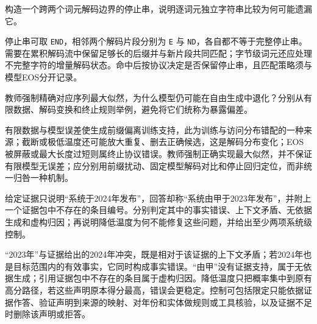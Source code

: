 \begin{exercises}
\begin{exercise} 构造一个跨两个词元解码边界的停止串，说明逐词元独立字符串比较为何可能遗漏它。

\begin{solution}
停止串可取 \texttt{END}，相邻两个解码片段分别为 \texttt{E} 与 \texttt{ND}，各自都不等于完整停止串。需要在累积解码流中保留足够长的后缀并与新片段共同匹配；字节级词元还应处理不完整字符的增量解码状态。命中后按协议决定是否保留停止串，且匹配策略须与模型EOS分开记录。
\end{solution}
\end{exercise}

\begin{exercise} 教师强制精确对应序列最大似然，为什么模型仍可能在自由生成中退化？分别从有限数据、解码变换和终止规则举例，避免将它们统称为暴露偏差。

\begin{solution}
有限数据与模型误差使生成前缀偏离训练支持，此为训练与访问分布错配的一种来源；截断或极低温度还可能放大重复、删去正确候选，这是解码分布变化；EOS被屏蔽或最大长度过短则属终止协议错误。教师强制正确实现最大似然，并不保证有限模型无误差；应分别用前缀扰动、固定模型解码对比和停止回归定位，而非统一归咎一种机制。
\end{solution}
\end{exercise}

\begin{exercise} 给定证据只说明“系统于2024年发布”，回答却称“系统由甲于2023年发布”，并附上一个证据包中不存在的条目编号。分别判定其中的事实错误、上下文矛盾、无依据生成和虚构归因；再说明降低温度为何不能修复这些问题，并给出至少两项系统级控制。

\begin{solution}
“2023年”与证据给出的2024年冲突，既是相对于该证据的上下文矛盾；若2024年也是目标范围内的有效事实，它同时构成事实错误。“由甲”没有证据支持，属于无依据生成；引用证据包中不存在的条目属于虚构归因。降低温度只把概率集中到原有高分路径，若这些声明原本得分最高，错误会更稳定。控制可包括限定只能依据证据作答、验证声明到来源的映射、对年份和实体做规则或工具核验，以及证据不足时删除该声明或拒答。
\end{solution}
\end{exercise}

\end{exercises}
